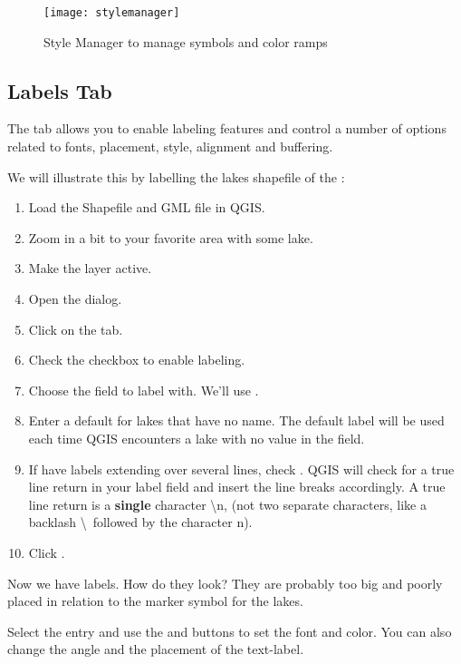 \begin{figure}[ht]
   \centering
   \caption{Style Manager to manage symbols and color ramps \nixcaption}\label{fig:stylemanager}
   \texttt{[image: stylemanager]}
\end{figure}

\subsection{Labels Tab}

The  tab allows you to enable labeling features and control a number of
options related to fonts, placement, style, alignment and buffering.

We will illustrate this by labelling the lakes shapefile of the
:

\begin{enumerate}
\item Load the Shapefile  and GML file  in QGIS.
\item Zoom in a bit to your favorite area with some lake.
\item Make the  layer active.
\item Open the  dialog.
\item Click on the  tab.
\item Check the  checkbox to enable labeling.
\item Choose the field to label with. 
  We'll use .
\item Enter a default for lakes that have no name. The default label will be
  used each time QGIS encounters a lake with no value in the 
field.
\item If have labels extending over several lines, check . QGIS will check for a true line return in your label field and
insert the line breaks accordingly. A true line return is a \textbf{single}
character \textbackslash n, (not two separate characters, like a backlash
\textbackslash ~followed by the character n).
\item Click .
\end{enumerate} 

Now we have labels. How do they look? They are probably too big and poorly
placed in relation to the marker symbol for the lakes.

Select the  entry and use the  and 
buttons to set the font and color. You can also change the angle and the
placement of the text-label.

